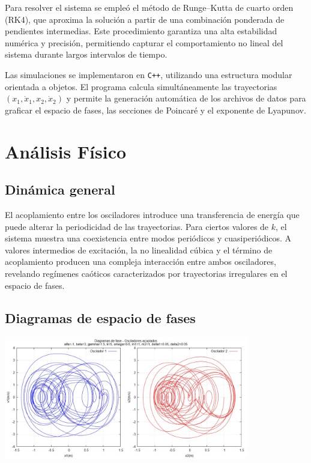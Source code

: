 \documentclass[12pt,a4paper]{article}
\begin{document}
Para resolver el sistema se empleó el método de Runge–Kutta de cuarto orden (RK4), que aproxima la solución a partir de una combinación ponderada de pendientes intermedias. Este procedimiento garantiza una alta estabilidad numérica y precisión, permitiendo capturar el comportamiento no lineal del sistema durante largos intervalos de tiempo.

Las simulaciones se implementaron en \texttt{C++}, utilizando una estructura modular orientada a objetos. El programa calcula simultáneamente las trayectorias $(x_1, \dot{x}_1, x_2, \dot{x}_2)$ y permite la generación automática de los archivos de datos para graficar el espacio de fases, las secciones de Poincaré y el exponente de Lyapunov.

\section{Análisis Físico}

\subsection{Dinámica general}

El acoplamiento entre los osciladores introduce una transferencia de energía que puede alterar la periodicidad de las trayectorias. Para ciertos valores de $k$, el sistema muestra una coexistencia entre modos periódicos y cuasiperiódicos. A valores intermedios de excitación, la no linealidad cúbica y el término de acoplamiento producen una compleja interacción entre ambos osciladores, revelando regímenes caóticos caracterizados por trayectorias irregulares en el espacio de fases.

\subsection{Diagramas de espacio de fases}

\vspace{1em}
\begin{center}
\includegraphics[width=0.8\textwidth]{figs/fase_placeholder.png}
\end{center}
\vspace{1em}
\end{document}
